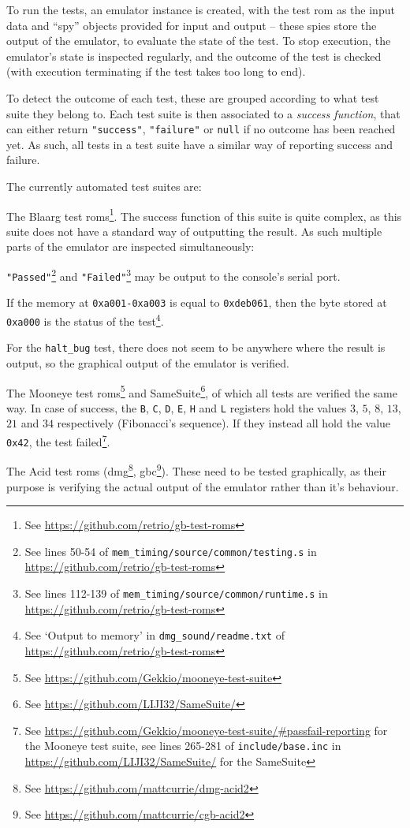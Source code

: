 \documentclass[11pt]{informatics-report}
\newcommand{\ftnt}[1]{\footnote{See \url{#1}}}
\begin{document}
To run the tests, an emulator instance is created, with the test \gls{rom} as the input data and ``spy'' objects provided for input and output -- these spies store the output of the emulator, to evaluate the state of the test. To stop execution, the emulator's state is inspected regularly, and the outcome of the test is checked (with execution terminating if the test takes too long to end).

To detect the outcome of each test, these are grouped according to what test suite they belong to. Each test suite is then associated to a \textit{success function}, that can either return \texttt{"success"}, \texttt{"failure"} or \texttt{null} if no outcome has been reached yet. As such, all tests in a test suite have a similar way of reporting success and failure.

The currently automated test suites are:
\begin{compactitem}
	\item The Blaarg test \glspl{rom}\ftnt{https://github.com/retrio/gb-test-roms}. The success function of this suite is quite complex, as this suite does not have a standard way of outputting the result. As such multiple parts of the emulator are inspected simultaneously:
		\begin{compactitem}
			\item \texttt{"Passed"}\footnote{See lines 50-54 of \texttt{mem\_timing/source/common/testing.s} in \url{https://github.com/retrio/gb-test-roms}} and \texttt{"Failed"}\footnote{See lines 112-139 of \texttt{mem\_timing/source/common/runtime.s} in \url{https://github.com/retrio/gb-test-roms}} may be output to the console's serial port.
			\item If the memory at \texttt{0xa001-0xa003} is equal to \texttt{0xdeb061}, then the byte stored at \texttt{0xa000} is the status of the test\footnote{See `Output to memory' in \texttt{dmg\_sound/readme.txt} of \url{https://github.com/retrio/gb-test-roms}}.
			\item For the \texttt{halt\_bug} test, there does not seem to be anywhere where the result is output, so the graphical output of the emulator is verified.
		\end{compactitem}
	\item The Mooneye test \glspl{rom}\ftnt{https://github.com/Gekkio/mooneye-test-suite} and SameSuite\ftnt{https://github.com/LIJI32/SameSuite/}, of which all tests are verified the same way. In case of success, the \texttt{B}, \texttt{C}, \texttt{D}, \texttt{E}, \texttt{H} and \texttt{L} registers hold the values $3$, $5$, $8$, $13$, $21$ and $34$ respectively (Fibonacci's sequence). If they instead all hold the value \texttt{0x42}, the test failed\footnote{See \url{https://github.com/Gekkio/mooneye-test-suite/\#passfail-reporting} for the Mooneye test suite, see lines 265-281 of \texttt{include/base.inc} in \url{https://github.com/LIJI32/SameSuite/} for the SameSuite}.
	\item The Acid test \glspl{rom} (\gls{dmg}\ftnt{https://github.com/mattcurrie/dmg-acid2}, \gls{gbc}\ftnt{https://github.com/mattcurrie/cgb-acid2}). These need to be tested graphically, as their purpose is verifying the actual output of the emulator rather than it's behaviour.
\end{compactitem}
\end{document}
